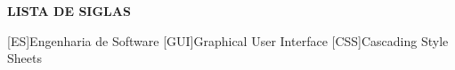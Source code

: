 \thispagestyle{empty}

\newcommand{\listofsiglasname}
{\vspace{15pt}
	\centering\normalsize
	{\normalfont\bfseries\Large\textbf{LISTA DE SIGLAS}}
	\vspace{15pt}
}


\listofsiglasname

\justifying


\begin{acronym}[]
	[ES]{Engenharia de Software}
	[GUI]{Graphical User Interface}
	[CSS]{Cascading Style Sheets}
\end{acronym}
